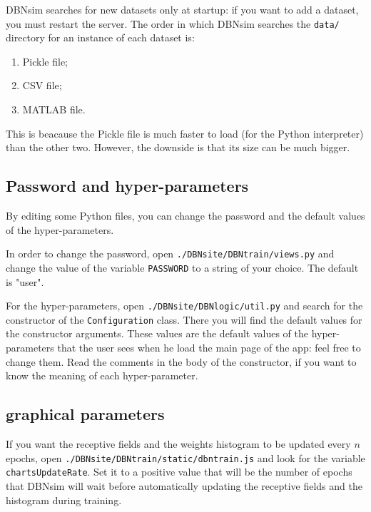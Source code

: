 \documentclass[a4paper]{article}
\begin{document}
DBNsim searches for new datasets only at startup: if you want to add a dataset, you must restart the server. The order in which DBNsim searches the \texttt{data/} directory for an instance of each dataset is:
		
	\begin{enumerate}
		
			
	\item Pickle file;
			
	\item CSV file;
			
	\item MATLAB file.
		
	\end{enumerate}

		
This is beacause the Pickle file is much faster to load (for the Python interpreter) than the other two. However, the downside is that its size can be much bigger.

		
	\subsection{Password and hyper-parameters}

		
By editing some Python files, you can change the password and the default values of the hyper-parameters.
		
In order to change the password, open \texttt{./DBNsite/DBNtrain/views.py} and change the value of the variable \texttt{PASSWORD} to a string of your choice. The default is "user".
		
For the hyper-parameters, open \texttt{./DBNsite/DBNlogic/util.py} and search for the constructor of the \texttt{Configuration} class. There you will find the default values for the constructor arguments. These values are the default values of the hyper-parameters that the user sees when he load the main page of the app: feel free to change them. Read the comments in the body of the constructor, if you want to know the meaning of each hyper-parameter.

		
	\subsection{graphical parameters}

		
If you want the receptive fields and the weights histogram to be updated every $n$ epochs, open \texttt{./DBNsite/DBNtrain/static/dbntrain.js} and look for the variable \texttt{chartsUpdateRate}. Set it to a positive value that will be the number of epochs that DBNsim will wait before automatically updating the receptive fields and the histogram during training.
		
\end{document}
